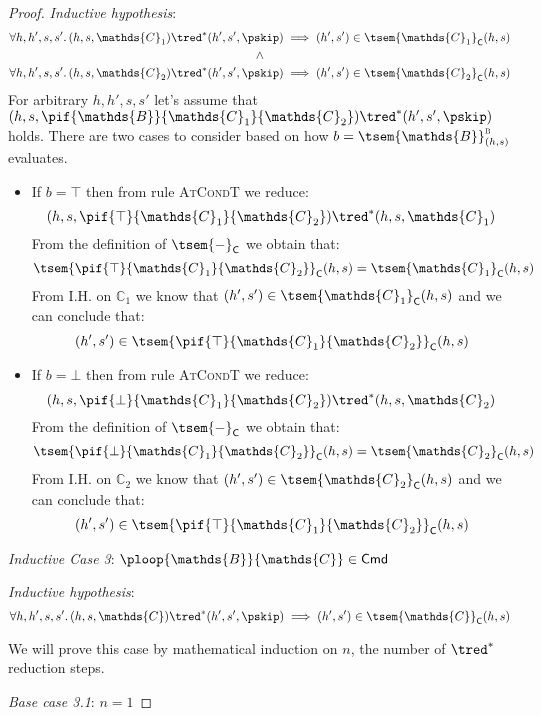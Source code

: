 \begin{lem}
{\begin{proof}
	\textit{Inductive hypothesis}:
	\begin{gather*}
		\forall h, h', s, s' \ldotp
		(h, s, \mathds{C}_1) \tred^* (h', s', \pskip)
		\implies
		(h', s') \in \tsem{\mathds{C}_1}_\mathsf{C}(h, s) \\
		\land \\
		\forall h, h', s, s' \ldotp
		(h, s, \mathds{C}_2) \tred^* (h', s', \pskip)
		\implies
		(h', s') \in \tsem{\mathds{C}_2}_\mathsf{C}(h, s)
	\end{gather*}
	For arbitrary $h, h', s, s'$ let's assume that $(h, s, \pif{\mathds{B}}{\mathds{C}_1}{\mathds{C}_2}) \tred^* (h', s', \pskip)$ holds. There are two cases to consider based on how $b = \tsem{\mathds{B}}^\textsc{b}_{(h, s)}$ evaluates.
	\begin{itemize}
		\item If $b = \top$ then from rule \textsc{AtCondT} we reduce:
			\[
				(h, s, \pif{\top}{\mathds{C}_1}{\mathds{C}_2}) \tred^* (h, s, \mathds{C}_1)
			\]
			From the definition of $\tsem{-}_\mathsf{C}$ we obtain that:
			\[
				\tsem{\pif{\top}{\mathds{C}_1}{\mathds{C}_2}}_\mathsf{C}(h, s) = \tsem{\mathds{C}_1}_\mathsf{C}(h,s)
			\]
			From I.H. on $\mathds{C}_1$ we know that $(h', s') \in \tsem{\mathds{C}_1}_\mathsf{C}(h, s)$ and we can conclude that:
			\[
				(h', s') \in \tsem{\pif{\top}{\mathds{C}_1}{\mathds{C}_2}}_\mathsf{C}(h, s)
			\]
		
		\item If $b = \bot$ then from rule \textsc{AtCondT} we reduce:
			\[
				(h, s, \pif{\bot}{\mathds{C}_1}{\mathds{C}_2}) \tred^* (h, s, \mathds{C}_2)
			\]
			From the definition of $\tsem{-}_\mathsf{C}$ we obtain that:
			\[
				\tsem{\pif{\bot}{\mathds{C}_1}{\mathds{C}_2}}_\mathsf{C}(h, s) = \tsem{\mathds{C}_2}_\mathsf{C}(h,s)
			\]
			From I.H. on $\mathds{C}_2$ we know that $(h', s') \in \tsem{\mathds{C}_2}_\mathsf{C}(h, s)$ and we can conclude that:
			\[
				(h', s') \in \tsem{\pif{\top}{\mathds{C}_1}{\mathds{C}_2}}_\mathsf{C}(h, s)
			\]
	\end{itemize}
	\indline
	\textit{Inductive Case 3}: $\ploop{\mathds{B}}{\mathds{C}} \in \mathsf{Cmd}$
	
	\textit{Inductive hypothesis}:
	\[
		\forall h, h', s, s' \ldotp
		(h, s, \mathds{C}) \tred^* (h', s', \pskip)
		\implies
		(h', s') \in \tsem{\mathds{C}}_\mathsf{C}(h, s)
	\]
	
	We will prove this case by mathematical induction on $n$, the number of $\tred^*$ reduction steps.
	
	\textit{Base case 3.1}: $n = 1$
	

\end{proof}}
\end{lem}
